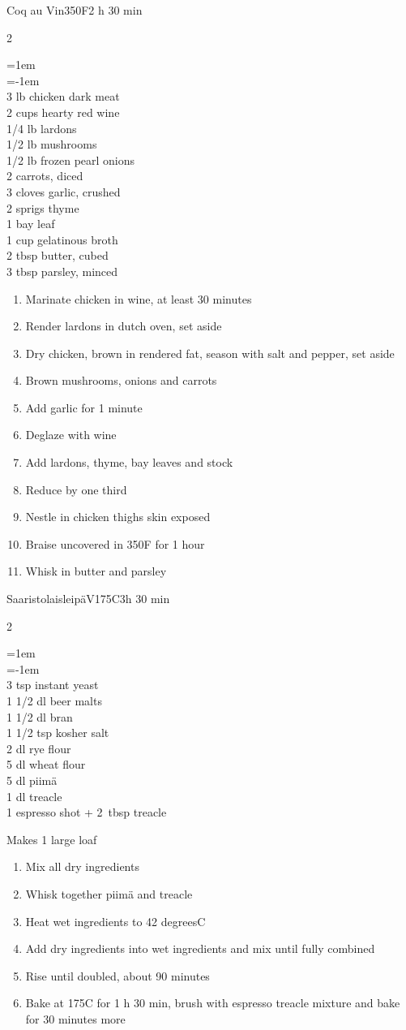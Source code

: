 \documentclass{article}
\newenvironment{recipe}[3][]
    {\begin{cardbase}[#1]{#2}{#3}
    \columnratio{0.333}
    \begin{paracol}{2}}
    {\end{paracol}\end{cardbase}}
\newenvironment{denserecipe}[3][]
    {\small
    \begin{recipe}[#1]{#2}{#3}}
    {\end{recipe}}
\newcommand{\nextcolumn}{\switchcolumn}
\newenvironment{ingredients}
    {
    \begin{obeylines}
    \vspace{\parskip}
    \setlength{\parskip}{0.25em}
    \vspace{-0.25em}
    \leftskip=1em
    \parindent=-1em}
    {\end{obeylines}}
\newenvironment{steps}
    {\begin{enumerate}[leftmargin=*,topsep=0pt]}
    {\end{enumerate}}
\newcommand{\celsius}[1]{#1\textdegree{}C}
\newcommand{\fahrenheit}[1]{#1\textdegree{}F}
\newcommand{\tag}[1]{\hspace{1em}#1}
\newcommand{\symboltag}[2]{\tag{#1\hspace{0.4em}#2}}
\newcommand{\totaltime}[1]{\symboltag{\raisebox{-0.1em}{\small\StopWatchEnd}}{#1}}
\newcommand{\preheat}[1]{\symboltag{\Topbottomheat}{#1}}
\begin{document}
\begin{denserecipe}{Coq au Vin}{\preheat{\fahrenheit{350}}\totaltime{2 h 30 min}}
\begin{ingredients}
3 lb chicken dark meat
2 cups hearty red wine
1/4 lb lardons
1/2 lb mushrooms
1/2 lb frozen pearl onions
2 carrots, diced
3 cloves garlic, crushed
2 sprigs thyme
1 bay leaf
1 cup gelatinous broth
2 tbsp butter, cubed
3 tbsp parsley, minced
\end{ingredients}
\nextcolumn
\begin{steps}
    \item Marinate chicken in wine, at least 30 minutes
    \item Render lardons in dutch oven, set aside
    \item Dry chicken, brown in rendered fat, season with salt and pepper, set aside
    \item Brown mushrooms, onions and carrots
    \item Add garlic for 1 minute
    \item Deglaze with wine
    \item Add lardons, thyme, bay leaves and stock
    \item Reduce by one third
    \item Nestle in chicken thighs skin exposed
    \item Braise uncovered in \fahrenheit{350} for 1 hour
    \item Whisk in butter and parsley
\end{steps}
\end{denserecipe}

\begin{recipe}{Saaristolaisleipä}{\tag{V}\preheat{\celsius{175}}\totaltime{3h 30 min}}
\begin{ingredients}
3 tsp instant yeast
1 1/2 dl beer malts
1 1/2 dl bran
1 1/2 tsp kosher salt
2 dl rye flour
5 dl wheat flour
5 dl piimä
1 dl treacle
1 espresso shot + 2~tbsp treacle
\end{ingredients}
\nextcolumn
Makes 1 large loaf
\begin{steps}
    \item Mix all dry ingredients
    \item Whisk together piimä and treacle
    \item Heat wet ingredients to \celsius{42 degrees}
    \item Add dry ingredients into wet ingredients and mix until fully combined
    \item Rise until doubled, about 90 minutes
    \item Bake at \celsius{175} for 1 h 30 min, brush with espresso treacle mixture and bake for 30 minutes more
\end{steps}
\end{recipe}
\end{document}
